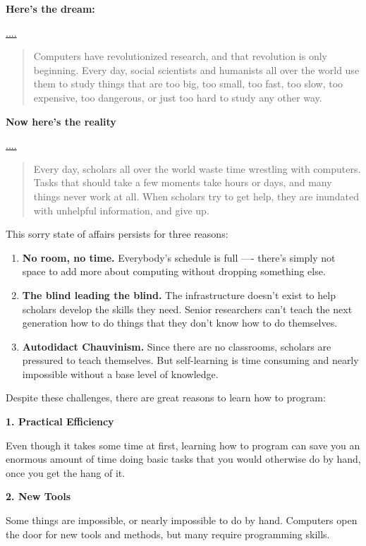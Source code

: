 \documentclass[]{book}
\begin{document}
\textbf{Here's the dream:}

\url{....}

\begin{quote}
Computers have revolutionized research, and that revolution is only
beginning. Every day, social scientists and humanists all over the world
use them to study things that are too big, too small, too fast, too
slow, too expensive, too dangerous, or just too hard to study any other
way.
\end{quote}

\textbf{Now here's the reality}

\url{....}

\begin{quote}
Every day, scholars all over the world waste time wrestling with
computers. Tasks that should take a few moments take hours or days, and
many things never work at all. When scholars try to get help, they are
inundated with unhelpful information, and give up.
\end{quote}

This sorry state of affairs persists for three reasons:

\begin{enumerate}
\def\labelenumi{\arabic{enumi}.}
\item
  \textbf{No room, no time.} Everybody's schedule is full ---- there's
  simply not space to add more about computing without dropping
  something else.
\item
  \textbf{The blind leading the blind.} The infrastructure doesn't exist
  to help scholars develop the skills they need. Senior researchers
  can't teach the next generation how to do things that they don't know
  how to do themselves.
\item
  \textbf{Autodidact Chauvinism.} Since there are no classrooms,
  scholars are pressured to teach themselves. But self-learning is time
  consuming and nearly impossible without a base level of knowledge.
\end{enumerate}

Despite these challenges, there are great reasons to learn how to
program:

\textbf{1. Practical Efficiency}

Even though it takes some time at first, learning how to program can
save you an enormous amount of time doing basic tasks that you would
otherwise do by hand, once you get the hang of it.

\textbf{2. New Tools}

Some things are impossible, or nearly impossible to do by hand.
Computers open the door for new tools and methods, but many require
programming skills.
\end{document}
